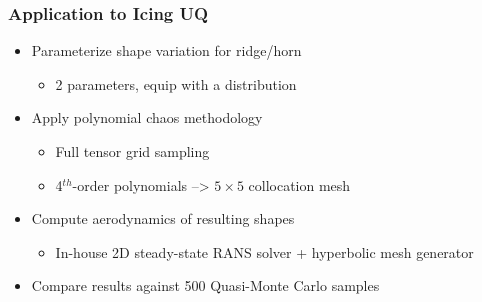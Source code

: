 \documentclass[9pt]{beamer}
\begin{document}
\begin{frame}
\frametitle{Application to Icing UQ}
\label{sec-2-6}

\begin{itemize}
\item Parameterize shape variation for ridge/horn
\begin{itemize}
\item 2 parameters, equip with a distribution
\end{itemize}
\item Apply polynomial chaos methodology
\begin{itemize}
\item Full tensor grid sampling
\item 4$^{th}$-order polynomials --> $5\times5$ collocation mesh
\end{itemize}
\item Compute aerodynamics of resulting shapes
\begin{itemize}
\item In-house 2D steady-state RANS solver + hyperbolic mesh generator
\end{itemize}
\item Compare results against 500 Quasi-Monte Carlo samples
\end{itemize}
\end{frame}
\end{document}
